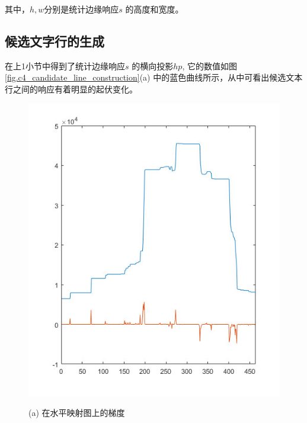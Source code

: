         其中，$h,w$分别是统计边缘响应$s$ 的高度和宽度。

        \subsection{候选文字行的生成}

        在上1小节中得到了统计边缘响应$s$ 的横向投影$hp$, 它的数值如图\ref{fig.c4_candidate_line_construction}(a) 中的蓝色曲线所示，从中可看出候选文本行之间的响应有着明显的起伏变化。

        \begin{figure}[!h]
        \begin{minipage}[t]{0.32\linewidth}
        \centering
        \includegraphics[width=\textwidth]{./figures/c4_gradient.jpg}
        \centerline{\small (a) 在水平映射图上的梯度}
        \end{minipage}
        \begin{minipage}[t]{0.32\linewidth}
        \centering

\end{minipage}
\end{figure}
